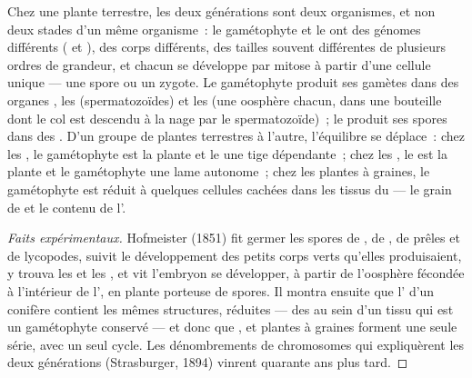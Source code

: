 \begin{proposition}\label{prop:b2:plant-life-cycles:alternation}
Chez une plante terrestre, les deux générations sont deux organismes, et
non deux stades d'un même organisme~: le gamétophyte et le 
ont des génomes différents ( et ), des corps différents,
des tailles souvent différentes de plusieurs ordres de grandeur, et
chacun se développe par mitose à partir d'une cellule unique --- une
spore ou un zygote. Le gamétophyte produit ses gamètes dans des organes
, les \emph{} (spermatozoïdes) et les
\emph{} (une oosphère chacun, dans une bouteille dont le col
est descendu à la nage par le spermatozoïde)~; le  produit
ses spores dans des \emph{}. D'un groupe de plantes terrestres
à l'autre, l'équilibre se déplace~: chez les , le gamétophyte
est la plante et le  une tige dépendante~; chez les ,
le  est la plante et le gamétophyte une lame autonome~; chez
les plantes à graines, le gamétophyte est réduit à quelques cellules
cachées dans les tissus du  --- le grain de  et le
contenu de l'.
\end{proposition}
\begin{proof}[Faits expérimentaux]
Hofmeister (1851) fit germer les spores de , de , de
prêles et de lycopodes, suivit le développement des petits corps verts
qu'elles produisaient, y trouva les  et les , et
vit l'embryon se développer, à partir de l'oosphère fécondée à
l'intérieur de l', en plante porteuse de spores. Il montra
ensuite que l' d'un conifère contient les mêmes structures,
réduites --- des  au sein d'un tissu qui est un gamétophyte
conservé --- et donc que ,  et plantes à graines forment
une seule série, avec un seul cycle. Les dénombrements de chromosomes
qui expliquèrent les deux générations (Strasburger, 1894) vinrent
quarante ans plus tard.
\end{proof}

